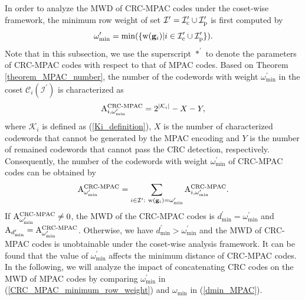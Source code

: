 \documentclass[12pt, draftclsnofoot, peerreview, onecolumn]{IEEEtran}
\theoremstyle{noparent}
\begin{document}
In order to analyze the MWD of CRC-MPAC codes under the coset-wise framework,
the minimum row weight of set 
$\mathcal{I}^{\prime}= \mathcal{I}_{\rm c}^{\prime} \cup \mathcal{I}_{\rm p}^{\prime}$ 
is first computed by
\begin{equation}
	\label{CRC_MPAC_minimum_row_weight}
	\omega_{\min}^{\prime}=\min(\{{{\rm w}(\mathbf{g}_i})|i\in 
	\mathcal{I}_{\rm c}^{\prime} \cup \mathcal{I}_{\rm p}^{\prime}\}).
\end{equation}
Note that in this subsection, we use the superscript $*^{\prime}$ to denote the parameters of CRC-MPAC codes 
with respect to that of MPAC codes.
Based on Theorem \ref{theorem_MPAC_number},
the number of the codewords with weight $\omega_{\min}^{\prime}$ in the coset $\mathcal{C}_i(\mathcal{I}^{\prime})$
is characterized as 
\begin{align}
    {\rm A}_{i,\omega_{\min}^{\prime}}^{\text{CRC-MPAC}} = 2^{|\mathcal{K}_i|} - X -Y,
\end{align}
where $\mathcal{K}_i$ is defined as (\ref{Ki_definition}), 
$X$ is the number of characterized codewords that cannot be generated by the MPAC encoding and 
$Y$ is the number of remained codewords that cannot pass the CRC detection, respectively.
Consequently, the number of the codewords with weight $\omega_{\min}^{\prime}$ of CRC-MPAC codes 
can be obtained by 
\begin{equation}
{\rm A}_{\omega_{\min}^{\prime}}^{\text{CRC-MPAC}}=
\sum_{i \in \mathcal{I}^{\prime}:\ {\rm w}({\bf g}_i)=\omega_{\min}^{\prime}} 
{\rm A}_{i,\omega_{\min}^{\prime}}^{\text{CRC-MPAC}}.
\end{equation}
If ${\rm A}_{\omega_{\min}^{\prime}}^{\text{CRC-MPAC}}\neq 0$, the MWD of the CRC-MPAC codes is
 $d_{\min}^{\prime}=\omega_{\min}^{\prime}$
and ${\rm A}_{d_{\min}^{\prime}}={\rm A}_{\omega_{\min}^{\prime}}^{\text{CRC-MPAC}}$.
Otherwise, we have $d_{\min}^{\prime}>\omega_{\min}^{\prime}$ and the MWD of CRC-MPAC codes is 
unobtainable under the coset-wise analysis framework.
It can be found that the value of $\omega_{\min}^{\prime}$ affects
the minimum distance of CRC-MPAC codes.  
In the following, we will analyze the impact of concatenating CRC codes on the MWD of 
MPAC codes by comparing $\omega_{\min}^{\prime}$ in (\ref{CRC_MPAC_minimum_row_weight}) and $\omega_{\min}$
in (\ref{dmin_MPAC}).
\end{document}
